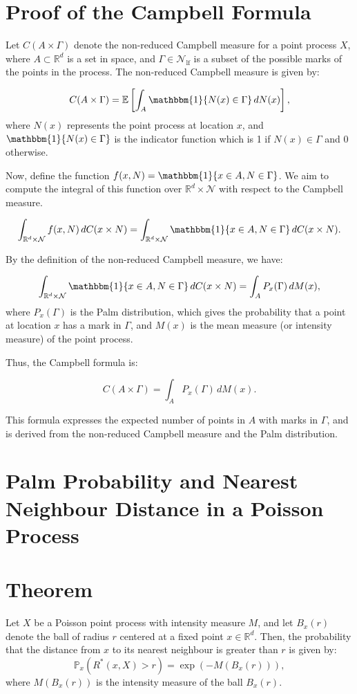 \documentclass{article}
\begin{document}
\section*{Proof of the Campbell Formula}

Let \( C(A \times \Gamma) \) denote the non-reduced Campbell measure for a point process \( X \), where \( A \subset \mathbb{R}^d \) is a set in space, and \( \Gamma \in \mathcal{N}_{\text{lf}} \) is a subset of the possible marks of the points in the process. The non-reduced Campbell measure is given by:

\[
C(A \times \Gamma) = \mathbb{E}\left[ \int_A \mathbbm{1}\{ N(x) \in \Gamma \} \, dN(x) \right],
\]
where \( N(x) \) represents the point process at location \( x \), and \( \mathbbm{1}\{ N(x) \in \Gamma \} \) is the indicator function which is 1 if \( N(x) \in \Gamma \) and 0 otherwise.

\noindent Now, define the function \( f(x, N) = \mathbbm{1}\{ x \in A, N \in \Gamma \} \). We aim to compute the integral of this function over \( \mathbb{R}^d \times \mathcal{N} \) with respect to the Campbell measure.

\[
\int_{\mathbb{R}^d \times \mathcal{N}} f(x, N) \, dC(x \times N) = \int_{\mathbb{R}^d \times \mathcal{N}} \mathbbm{1}\{ x \in A, N \in \Gamma \} \, dC(x \times N).
\]

By the definition of the non-reduced Campbell measure, we have:

\[
\int_{\mathbb{R}^d \times \mathcal{N}} \mathbbm{1}\{ x \in A, N \in \Gamma \} \, dC(x \times N) = \int_A P_x(\Gamma) \, dM(x),
\]
where \( P_x(\Gamma) \) is the Palm distribution, which gives the probability that a point at location \( x \) has a mark in \( \Gamma \), and \( M(x) \) is the mean measure (or intensity measure) of the point process. 

Thus, the Campbell formula is:

\[
C(A \times \Gamma) = \int_A P_x(\Gamma) \, dM(x).
\]

This formula expresses the expected number of points in \( A \) with marks in \( \Gamma \), and is derived from the non-reduced Campbell measure and the Palm distribution.


\section*{Palm Probability and Nearest Neighbour Distance in a Poisson Process}

\section*{Theorem}
Let \( X \) be a Poisson point process with intensity measure \( M \), and let \( B_x(r) \) denote the ball of radius \( r \) centered at a fixed point \( x \in \mathbb{R}^d \). Then, the probability that the distance from \( x \) to its nearest neighbour is greater than \( r \) is given by:
\[
\mathbb{P}_x(R^*(x, X) > r) = \exp\left(-M(B_x(r))\right),
\]
where \( M(B_x(r)) \) is the intensity measure of the ball \( B_x(r) \).
\end{document}
